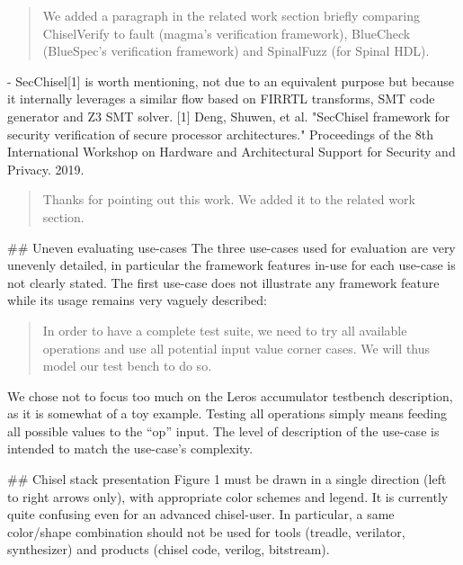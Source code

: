 \documentclass{article}
\newcommand{\todo}[1]{{\color{olive} TODO: #1}}
\newcommand{\reply}[1]{{\color{blue} #1}}
\begin{document}

\begin{quote}
\reply{We added a paragraph in the related work section briefly comparing ChiselVerify to fault (magma's verification framework), BlueCheck (BlueSpec's verification framework) and SpinalFuzz (for Spinal HDL).}
\end{quote}

- SecChisel[1] is worth mentioning, not due to an equivalent purpose but because it internally leverages a similar flow based on FIRRTL transforms, SMT code generator and Z3 SMT solver.
[1] Deng, Shuwen, et al. "SecChisel framework for security verification of secure processor architectures." Proceedings of the 8th International Workshop on Hardware and Architectural Support for Security and Privacy. 2019.

\begin{quote}
\reply{Thanks for pointing out this work. We added it to the related work section.}
\end{quote}


\#\# Uneven evaluating use-cases
The three use-cases used for evaluation are very unevenly detailed, in particular the framework features in-use for each use-case is not clearly stated.
The first use-case does not illustrate any framework feature while its usage remains very vaguely described:
\begin{quote}
In order to have a complete test suite,
we need to try all available operations and use all potential
input value corner cases. We will thus model our test bench
to do so.  
\end{quote}

\reply{We chose not to focus too much on the Leros accumulator testbench description, as it is somewhat of a toy example. 
Testing all operations simply means feeding all possible values to the ``op'' input.
The level of description of the use-case is intended to match the use-case's complexity.
}


\#\# Chisel stack presentation
Figure 1 must be drawn in a single direction (left to right arrows only), with appropriate color schemes and legend. It is currently quite confusing even for an advanced chisel-user.
In particular, a same color/shape combination should not be used for tools (treadle, verilator, synthesizer) and products (chisel code, verilog, bitstream).
\end{document}
